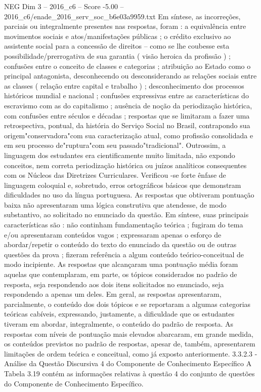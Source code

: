 \begin{textsample}{NEG Dim 3 – 2016\_c6 – Score -5.00 – 2016\_c6/enade\_2016\_serv\_soc\_b6e03a9959.txt}
Em síntese, as incorreções, parciais ou integralmente presentes nas respostas, foram : a equivalência entre movimentos sociais e atos/manifestações públicas ; o crédito exclusivo ao assistente social para a concessão de direitos – como se lhe coubesse esta possibilidade/prerrogativa de sua garantia ( visão heroica da profissão ) ; confusões entre o conceito de classes e categorias ; atribuição ao Estado como o principal antagonista, desconhecendo ou desconsiderando as relações sociais entre as classes ( relação entre capital e trabalho ) ; desconhecimento dos processos históricos mundial e nacional ; confusões expressivas entre as características do escravismo com as do capitalismo ; ausência de noção da periodização histórica, com confusões entre séculos e décadas ; respostas que se limitaram a fazer uma retrospectiva, pontual, da história do Serviço Social no Brasil, contrapondo sua origem"conservadora"com sua caracterização atual, como profissão consolidada e em seu processo de"ruptura"com seu passado"tradicional".
Outrossim, a linguagem dos estudantes era cientificamente muito limitada, não expondo conceitos, nem correta periodização histórica ou juízos analíticos consequentes com os Núcleos das Diretrizes Curriculares.
Verificou -se forte ênfase de linguagem coloquial e, sobretudo, erros ortográficos básicos que demonstram dificuldades no uso da língua portuguesa.
As respostas que obtiveram pontuação baixa não apresentaram uma lógica construtiva que atendesse, de modo substantivo, ao solicitado no enunciado da questão.
Em síntese, suas principais características são : não continham fundamentação teórica ; fugiram do tema e/ou apresentaram conteúdos vagos ; expressaram apenas o esforço de abordar/repetir o conteúdo do texto do enunciado da questão ou de outras questões da prova ; fizeram referência a algum conteúdo teórico-conceitual de modo incipiente.
As respostas que alcançaram uma pontuação média foram aquelas que contemplaram, em parte, os tópicos considerados no padrão de resposta, seja respondendo aos dois itens solicitados no enunciado, seja respondendo a apenas um deles.
Em geral, as respostas apresentaram, parcialmente, o conteúdo dos dois tópicos e se reportaram a algumas categorias teóricas cabíveis, expressando, justamente, a dificuldade que os estudantes tiveram em abordar, integralmente, o conteúdo do padrão de resposta.
As respostas com níveis de pontuação mais elevados abarcaram, em grande medida, os conteúdos previstos no padrão de respostas, apesar de, também, apresentarem limitações de ordem teórica e conceitual, como já exposto anteriormente. 3.3.2.3 - Análise da Questão Discursiva 4 do Componente de Conhecimento Específico A Tabela 3.19 contém as informações relativas à questão 4 do conjunto de questões do Componente de Conhecimento Específico.

\end{textsample}
